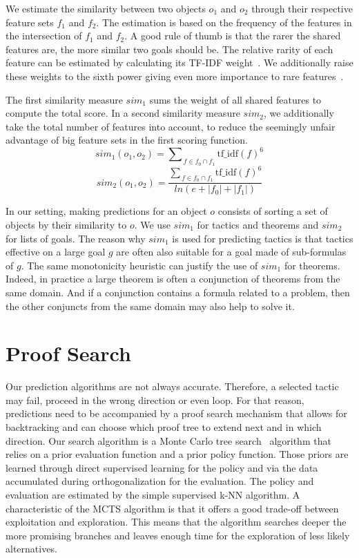 \documentclass[runningheads,a4paper,draft]{svjour3}
\begin{document}
We estimate the similarity between two objects $o_1$ and $o_2$
through their respective feature sets $f_1$ and $f_2$.
The estimation is based on the frequency of the features in the intersection of
$f_1$ and $f_2$. A good rule of thumb is that the rarer the shared features
are, the more similar two goals should be. The relative rarity of each feature
can be estimated by calculating its TF-IDF weight~\cite{Jones72astatistical}.
We additionally raise these weights to the sixth power giving
even more importance
to rare features~\cite{BlanchetteGKKU16}.

The first similarity measure $\mathit{sim}_1$ sums the weight of all shared
features to compute the total score.
In a second similarity measure $\mathit{sim}_2$, we additionally take
the total number of features into account, to reduce the seemingly unfair
advantage of big
feature sets in the first scoring function.
\[\mathit{sim}_1 (o_1, o_2) = {\sum\nolimits_{\,f \in f_0 \cap
f_1}{\mathrm{tf\_idf}(f)^{6}}}\]
\[\mathit{sim}_2 (o_1, o_2) = \frac{{\sum\nolimits_{\,f \in f_0 \cap
f_1}{\mathrm{tf\_idf}(f)^{6}}}}
{ln (e + |f_0| + |f_1|)}\]

In our setting, making predictions for an object $o$ consists of sorting a set
of objects by their similarity to $o$. We use $\mathit{sim}_1$ for tactics and theorems
and $\mathit{sim}_2$ for lists of goals. The reason why $\mathit{sim}_1$ is used for
predicting tactics is that tactics effective on a large goal $g$ are often also
suitable for a goal made of sub-formulas of $g$. The same monotonicity
heuristic can justify the use of $\mathit{sim}_1$ for theorems. Indeed, in practice a
large theorem is often a conjunction of theorems from the same domain.
And if a conjunction contains a formula related to a problem, then the other
conjuncts from the same domain may also help to solve it.


\section{Proof Search}\label{sec:proofsearch}

Our prediction algorithms are not always accurate.
Therefore, a selected tactic may
fail, proceed in the wrong direction or even loop.
For that reason, predictions need to be accompanied by a
proof search mechanism that allows for backtracking and
can choose which proof tree to extend next and in which direction.
Our search algorithm is a Monte Carlo tree search~\cite{montecarlo} algorithm
that relies on a prior evaluation function and a prior policy function. Those 
priors are learned through direct supervised learning for the policy and via 
the data accumulated during orthogonalization for the evaluation. The
policy and evaluation are estimated by the simple supervised k-NN algorithm.
A characteristic of the MCTS algorithm is that it offers a good trade-off
between exploitation and exploration. This means that the algorithm searches
deeper the more promising branches and leaves enough time for the exploration
of less likely alternatives.
\end{document}
